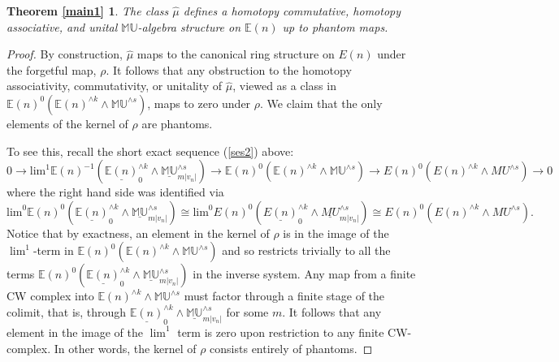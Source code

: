\documentclass[12pt]{amsart}
\numberwithin{equation}{section}
\theoremstyle{plain}  %
\newtheorem*{main1}{Theorem \ref{main1}}
\theoremstyle{definition}  %
\newcommand{\MU}{\mathbb {MU}}
\newcommand{\E}{\mathbb{E}}
\begin{document}
\medskip
\begin{main1}
The class $\hat{\mu}$ defines a homotopy commutative, homotopy associative, and unital $\MU$-algebra structure on $\E(n)$ up to phantom maps.
\end{main1}
\begin{proof} By construction, $\hat{\mu}$ maps to the canonical ring structure on $E(n)$ under the forgetful map, $\rho$. It follows that any obstruction to the homotopy associativity, commutativity, or unitality of $\hat{\mu}$, viewed as a class in $\E(n)^0(\E(n)^{\wedge k} \wedge \MU^{\wedge s})$, maps to zero under $\rho$. We claim that the only elements of the kernel of $\rho$ are phantoms.

To see this, recall the short exact sequence (\ref{ses2}) above:
\begin{equation*} 0 \rightarrow \text{lim}^1 \E(n)^{-1} (\underline{\E(n)}_0^{\wedge k} \wedge \underline{\MU}_{m|v_n|}^{\wedge s})  \rightarrow \E(n)^0(\E(n)^{\wedge k} \wedge \MU^{\wedge s}) \rightarrow E(n)^0(E(n)^{\wedge k} \wedge MU^{\wedge s}) \rightarrow 0 \end{equation*}
where the right hand side was identified via
$$\text{lim}^0\E(n)^0(\underline{\E(n)}_0^{\wedge k} \wedge \underline{\MU}_{m|v_n|}^{\wedge s}) \cong \text{lim}^0E(n)^0(\underline{E(n)}_0^{\wedge k} \wedge \underline{MU}_{m|v_n|}^{\wedge s}) \cong E(n)^0(E(n)^{\wedge k} \wedge MU^{\wedge s}).$$
Notice that by exactness, an element in the kernel of $\rho$ is in the image of the $\lim^1$-term in $\E(n)^0(\E(n)^{\wedge k} \wedge \MU^{\wedge s})$ and so restricts trivially to all the terms $\E(n)^0(\underline{\E(n)}_0^{\wedge k} \wedge \underline{\MU}^{\wedge s}_{m|v_n|})$ in the inverse system. Any map from a finite CW complex into $\E(n)^{\wedge k} \wedge \MU^{\wedge s}$ must factor through a finite stage of the colimit, that is, through $\underline{\E(n)}_0^{\wedge k} \wedge \underline{\MU}^{\wedge s}_{m|v_n|}$ for some $m$. It follows that any element in the image of the $\lim^1$ term is zero upon restriction to any finite CW-complex. In other words, the kernel of $\rho$ consists entirely of phantoms.
\end{proof}
\end{document}
